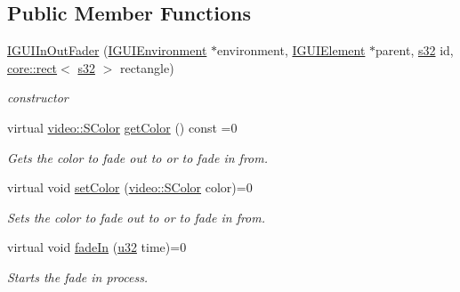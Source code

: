 \subsection*{Public Member Functions}
\begin{DoxyCompactItemize}
\item 
\mbox{\label{classirr_1_1gui_1_1IGUIInOutFader_ad839c9be778846aa0fba823c7dd30c69}} 
\hyperlink{classirr_1_1gui_1_1IGUIInOutFader_ad839c9be778846aa0fba823c7dd30c69}{I\+G\+U\+I\+In\+Out\+Fader} (\hyperlink{classirr_1_1gui_1_1IGUIEnvironment}{I\+G\+U\+I\+Environment} $\ast$environment, \hyperlink{classirr_1_1gui_1_1IGUIElement}{I\+G\+U\+I\+Element} $\ast$parent, \hyperlink{namespaceirr_ac66849b7a6ed16e30ebede579f9b47c6}{s32} id, \hyperlink{classirr_1_1core_1_1rect}{core\+::rect}$<$ \hyperlink{namespaceirr_ac66849b7a6ed16e30ebede579f9b47c6}{s32} $>$ rectangle)
\begin{DoxyCompactList}\small\item\em constructor \end{DoxyCompactList}\item 
\mbox{\label{classirr_1_1gui_1_1IGUIInOutFader_adeed9c5ffd4b9ab6180cba40596742b9}} 
virtual \hyperlink{classirr_1_1video_1_1SColor}{video\+::\+S\+Color} \hyperlink{classirr_1_1gui_1_1IGUIInOutFader_adeed9c5ffd4b9ab6180cba40596742b9}{get\+Color} () const =0
\begin{DoxyCompactList}\small\item\em Gets the color to fade out to or to fade in from. \end{DoxyCompactList}\item 
virtual void \hyperlink{classirr_1_1gui_1_1IGUIInOutFader_aba1cdb4928662a2340aa6600850e03d1}{set\+Color} (\hyperlink{classirr_1_1video_1_1SColor}{video\+::\+S\+Color} color)=0
\begin{DoxyCompactList}\small\item\em Sets the color to fade out to or to fade in from. \end{DoxyCompactList}\item 
virtual void \hyperlink{classirr_1_1gui_1_1IGUIInOutFader_a407edab8f7e349612d62c39accc159e2}{fade\+In} (\hyperlink{namespaceirr_a0416a53257075833e7002efd0a18e804}{u32} time)=0
\begin{DoxyCompactList}\small\item\em Starts the fade in process. \end{DoxyCompactList}\item 

\end{DoxyCompactItemize}
